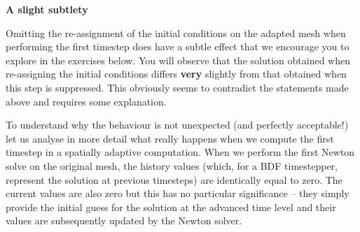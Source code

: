 \begin{center} {\bfseries A slight subtlety} \end{center} 

Omitting the re-\/assignment of the initial conditions on the adapted mesh when performing the first timestep does have a subtle effect that we encourage you to explore in the exercises below. You will observe that the solution obtained when re-\/assigning the initial conditions differs {\bfseries very} slightly from that obtained when this step is suppressed. This obviously seems to contradict the statements made above and requires some explanation.

To understand why the behaviour is not unexpected (and perfectly acceptable!) let us analyse in more detail what really happens when we compute the first timestep in a spatially adaptive computation. When we perform the first Newton solve on the original mesh, the history values (which, for a B\+DF timestepper, represent the solution at previous timesteps) are identically equal to zero. The current values are also zero but this has no particular significance -- they simply provide the initial guess for the solution at the advanced time level and their values are subsequently updated by the Newton solver.

